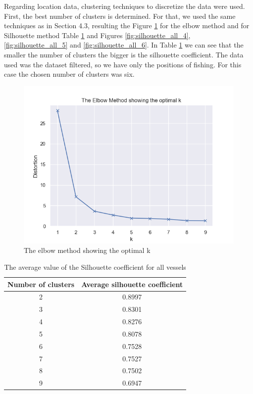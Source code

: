 Regarding location data, clustering techniques to discretize the data were used.
First, the best number of clusters is determined. For that, we used the same techniques as in Section 4.3, resulting the Figure \ref{fig:elbow_method_server} for the elbow method and for Silhouette method Table \ref{table:all_silhouette} and Figures \ref{fig:silhouette_all_4}, \ref{fig:silhouette_all_5} and \ref{fig:silhouette_all_6}. In Table  \ref{table:all_silhouette} we can see that the smaller the number of clusters the bigger is the silhouette coefficient.
The data used was the dataset filtered, so we have only the positions of fishing. For this case the chosen number of clusters was six.

\begin{figure}[H]
\centering
\includegraphics[width=0.8\linewidth]{Chapters/img/elbow_method_server.png}
\caption{The elbow method showing the optimal k}
\label{fig:elbow_method_server}
\end{figure}

\begin {table}[h]
\caption {The average value of the Silhouette coefficient for all vessels}
\begin{center}
\begin{tabular}{c|c}
\textbf{Number of clusters} & \textbf{Average silhouette coefficient}  \\
\hline
2 & 0.8997  \\
3 & 0.8301  \\
4 & 0.8276  \\
5 & 0.8078  \\
6 & 0.7528  \\
7 & 0.7527  \\
8 & 0.7502  \\
9 & 0.6947  
\label{table:all_silhouette}
\end{tabular}
\end{center}
\end {table}



